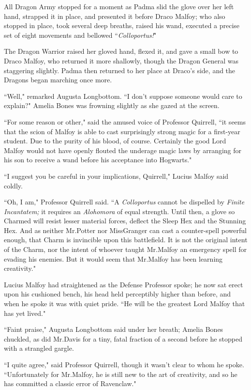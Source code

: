 All Dragon Army stopped for a moment as Padma slid the glove over her left hand, strapped it in place, and presented it before Draco Malfoy; who also stopped in place, took several deep breaths, raised his wand, executed a precise set of eight movements and bellowed ``\emph{Colloportus!}"

The Dragon Warrior raised her gloved hand, flexed it, and gave a small bow to Draco Malfoy, who returned it more shallowly, though the Dragon General was staggering slightly. Padma then returned to her place at Draco's side, and the Dragons began marching once more.

``Well," remarked Augusta Longbottom. ``I don't suppose someone would care to explain?" Amelia Bones was frowning slightly as she gazed at the screen.

``For some reason or other," said the amused voice of Professor Quirrell, ``it seems that the scion of Malfoy is able to cast surprisingly strong magic for a first-year student. Due to the purity of his blood, of course. Certainly the good Lord Malfoy would not have openly flouted the underage magic laws by arranging for his son to receive a wand before his acceptance into Hogwarts."

``I suggest you be careful in your implications, Quirrell," Lucius Malfoy said coldly.

``Oh, I am," Professor Quirrell said. ``A \emph{Colloportus} cannot be dispelled by \emph{Finite Incantatem;} it requires an \emph{Alohomora} of equal strength. Until then, a glove so Charmed will resist lesser material forces, deflect the Sleep Hex and the Stunning Hex. And as neither Mr.\?Potter nor Miss\?Granger can cast a counter-spell powerful enough, that Charm is invincible upon this battlefield. It is not the original intent of the Charm, nor the intent of whoever taught Mr.\?Malfoy an emergency spell for evading his enemies. But it would seem that Mr.\?Malfoy has been learning creativity."

Lucius Malfoy had straightened as the Defense Professor spoke; he now sat erect upon his cushioned bench, his head held perceptibly higher than before, and when he spoke it was with quiet pride. ``He will be the greatest Lord Malfoy that has yet lived."

``Faint praise," Augusta Longbottom said under her breath; Amelia Bones chuckled, as did Mr.\?Davis for a tiny, fatal fraction of a second before he stopped with a strangled gargle.

``I quite agree," said Professor Quirrell, though it wasn't clear to whom he spoke. ``Unfortunately for Mr.\?Malfoy, he is still new to the art of creativity, and so he has committed a classic error of Ravenclaw."

